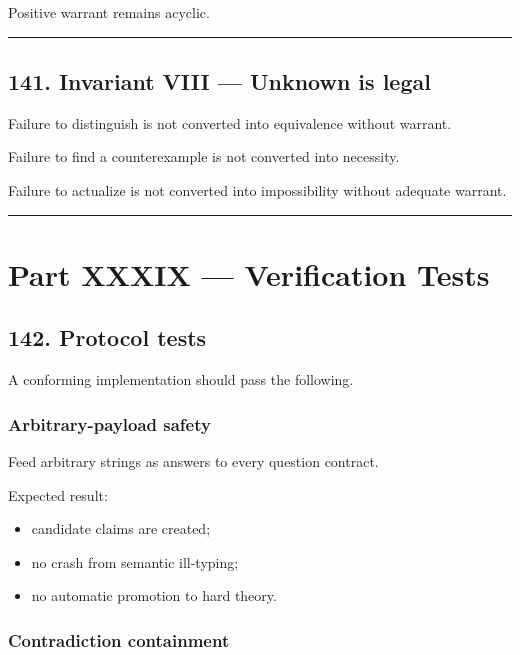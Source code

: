 \documentclass[
]{article}
\providecommand{\tightlist}{%
  \setlength{\itemsep}{0pt}\setlength{\parskip}{0pt}}
\begin{document}
Positive warrant remains acyclic.

\begin{center}\rule{0.5\linewidth}{0.5pt}\end{center}

\subsection{141. Invariant VIII --- Unknown is
legal}\label{invariant-viii-unknown-is-legal}

Failure to distinguish is not converted into equivalence without
warrant.

Failure to find a counterexample is not converted into necessity.

Failure to actualize is not converted into impossibility without
adequate warrant.

\begin{center}\rule{0.5\linewidth}{0.5pt}\end{center}

\section{Part XXXIX --- Verification
Tests}\label{part-xxxix-verification-tests}

\subsection{142. Protocol tests}\label{protocol-tests}

A conforming implementation should pass the following.

\subsubsection{Arbitrary-payload safety}\label{arbitrary-payload-safety}

Feed arbitrary strings as answers to every question contract.

Expected result:

\begin{itemize}
\tightlist
\item
  candidate claims are created;
\item
  no crash from semantic ill-typing;
\item
  no automatic promotion to hard theory.
\end{itemize}

\subsubsection{Contradiction
containment}\label{contradiction-containment}
\end{document}
